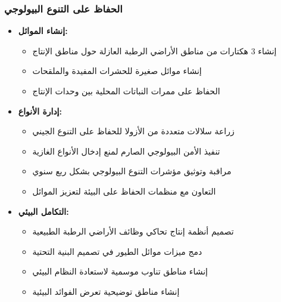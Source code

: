 \subsubsection{الحفاظ على التنوع البيولوجي}
\begin{itemize}
    \item \textbf{إنشاء الموائل:}
    \begin{itemize}
        \item إنشاء 3 هكتارات من مناطق الأراضي الرطبة العازلة حول مناطق الإنتاج
        \item إنشاء موائل صغيرة للحشرات المفيدة والملقحات
        \item الحفاظ على ممرات النباتات المحلية بين وحدات الإنتاج
    \end{itemize}
    
    \item \textbf{إدارة الأنواع:}
    \begin{itemize}
        \item زراعة سلالات متعددة من الأزولا للحفاظ على التنوع الجيني
        \item تنفيذ الأمن البيولوجي الصارم لمنع إدخال الأنواع الغازية
        \item مراقبة وتوثيق مؤشرات التنوع البيولوجي بشكل ربع سنوي
        \item التعاون مع منظمات الحفاظ على البيئة لتعزيز الموائل
    \end{itemize}
    
    \item \textbf{التكامل البيئي:}
    \begin{itemize}
        \item تصميم أنظمة إنتاج تحاكي وظائف الأراضي الرطبة الطبيعية
        \item دمج ميزات موائل الطيور في تصميم البنية التحتية
        \item إنشاء مناطق تناوب موسمية لاستعادة النظام البيئي
        \item إنشاء مناطق توضيحية تعرض الفوائد البيئية
    \end{itemize}
\end{itemize}

